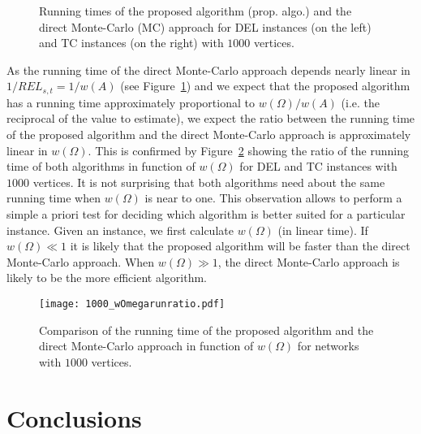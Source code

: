 \documentclass{article}
\begin{document}
\begin{figure}[h!]
\begin{center}
\caption{\label{fig:1000_compare} Running times of the proposed
algorithm (prop. algo.) and the direct \mbox{Monte-Carlo} (MC) approach
for DEL instances (on the left) and TC instances (on the right) with 
$1000$ vertices.}
\end{center}
\end{figure}

As the running time of the direct \mbox{Monte-Carlo} approach
depends nearly linear in $1/REL_{s,t}=1/w(A)$ (see
Figure~\ref{fig:1000_compare}) and
we expect that the proposed algorithm has a running time approximately
proportional to $w(\Omega)/w(A)$ (i.e. the reciprocal of the value
to estimate), we
expect the ratio between the running time of the proposed algorithm
and the direct \mbox{Monte-Carlo} approach is approximately linear
in $w(\Omega)$. This is confirmed by Figure~\ref{fig:1000_wOmegarunratio}
showing the ratio of the running time of both algorithms in function
of $w(\Omega)$ for DEL and TC instances with $1000$ vertices.
It is not surprising that both algorithms need about the same running time
when $w(\Omega)$ is near to one. This observation allows to perform a
simple a priori test for deciding which algorithm is better suited
for a particular instance. Given an instance, we first calculate
$w(\Omega)$ (in linear time). If $w(\Omega) \ll 1$ it is likely that
the proposed algorithm will be faster than the direct \mbox{Monte-Carlo}
approach. When $w(\Omega) \gg 1$, the direct \mbox{Monte-Carlo} approach
is likely to be the more efficient algorithm.

\begin{figure}[ht!]
\begin{center}
\texttt{[image: 1000\_wOmegarunratio.pdf]}
\caption{\label{fig:1000_wOmegarunratio} Comparison of the running time of the proposed
algorithm and the direct \mbox{Monte-Carlo} approach in function of $w(\Omega)$
for networks with $1000$ vertices.}
\end{center}
\end{figure}

\section{Conclusions}
\end{document}

